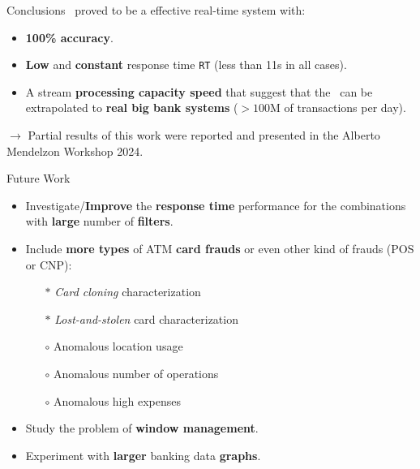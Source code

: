 
\begin{frame}{Conclusions}
\DPATM\ proved to be a effective real-time system with:
\vspace{1em}
\begin{itemize}
    \item \textbf{100\% accuracy}.
    \vspace{1em}
    \item \textbf{Low} and \textbf{constant} response time \texttt{RT} (less than 11s in all cases).
    \vspace{1em}
    \item A stream \textbf{processing capacity speed} that suggest that the \DPATM\ can be extrapolated to \textbf{real big bank systems} ($> 100$M of transactions per day).
\end{itemize}
\vspace{2em}
$\rightarrow$ Partial results of this work were reported and presented in the Alberto Mendelzon
Workshop 2024.

\end{frame}

\begin{frame}{Future Work}
\begin{itemize}
    \item Investigate/\textbf{Improve} the \textbf{response time} performance for the combinations with \textbf{large} number of \textbf{filters}.
    \vspace{1em}
    \item Include \textbf{more types} of ATM \textbf{card frauds} or even other kind of frauds (POS or CNP):
    \vspace{0.5em}
        \begin{itemize}
            \item[$\ast$] \emph{Card cloning} characterization
            \item[$\ast$] \emph{Lost-and-stolen} card characterization
            \item[$\circ$] Anomalous location usage
            \item[$\circ$] Anomalous number of operations
            \item[$\circ$] Anomalous high expenses
        \end{itemize}
    \vspace{1em}
    \item Study the problem of \textbf{window management}.
    \vspace{1em}
    \item Experiment with \textbf{larger} banking data \textbf{graphs}.
\end{itemize}
\end{frame}


